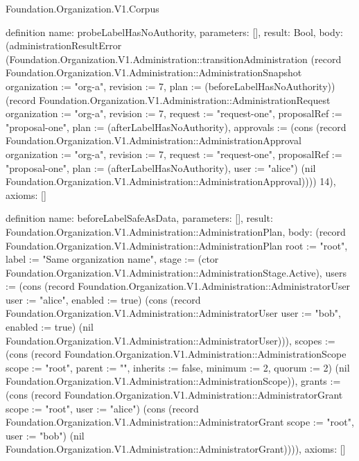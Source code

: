 \begin{lexlean}{Foundation.Organization.V1.Corpus}
\begin{semanticmodule}
definition{
  name: probeLabelHasNoAuthority,
  parameters: [],
  result: Bool,
  body: (administrationResultError (Foundation.Organization.V1.Administration::transitionAdministration (record Foundation.Organization.V1.Administration::AdministrationSnapshot {organization := "org-a", revision := 7, plan := (beforeLabelHasNoAuthority)}) (record Foundation.Organization.V1.Administration::AdministrationRequest {organization := "org-a", revision := 7, request := "request-one", proposalRef := "proposal-one", plan := (afterLabelHasNoAuthority), approvals := (cons (record Foundation.Organization.V1.Administration::AdministrationApproval {organization := "org-a", revision := 7, request := "request-one", proposalRef := "proposal-one", plan := (afterLabelHasNoAuthority), user := "alice"}) (nil Foundation.Organization.V1.Administration::AdministrationApproval))})) 14),
  axioms: []
}

definition{
  name: beforeLabelSafeAsData,
  parameters: [],
  result: Foundation.Organization.V1.Administration::AdministrationPlan,
  body: (record Foundation.Organization.V1.Administration::AdministrationPlan {root := "root", label := "Same organization name", stage := (ctor Foundation.Organization.V1.Administration::AdministrationStage.Active), users := (cons (record Foundation.Organization.V1.Administration::AdministratorUser {user := "alice", enabled := true}) (cons (record Foundation.Organization.V1.Administration::AdministratorUser {user := "bob", enabled := true}) (nil Foundation.Organization.V1.Administration::AdministratorUser))), scopes := (cons (record Foundation.Organization.V1.Administration::AdministrationScope {scope := "root", parent := "", inherits := false, minimum := 2, quorum := 2}) (nil Foundation.Organization.V1.Administration::AdministrationScope)), grants := (cons (record Foundation.Organization.V1.Administration::AdministratorGrant {scope := "root", user := "alice"}) (cons (record Foundation.Organization.V1.Administration::AdministratorGrant {scope := "root", user := "bob"}) (nil Foundation.Organization.V1.Administration::AdministratorGrant)))}),
  axioms: []
}


\end{semanticmodule}
\end{lexlean}
